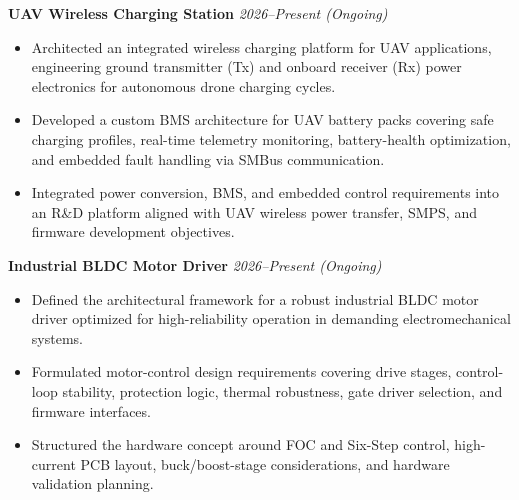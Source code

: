 \documentclass[a4paper,10pt]{article}
\newcommand{\projectheading}[2]{%
  \vspace{4pt}\noindent\textbf{#1} \hfill \textit{\small #2}\\%
}
\begin{document}
\projectheading{UAV Wireless Charging Station}{2026--Present \normalfont\small(Ongoing)}
\begin{itemize}
  \item Architected an integrated wireless charging platform for UAV applications, engineering
        ground transmitter (Tx) and onboard receiver (Rx) power electronics for autonomous
        drone charging cycles.
  \item Developed a custom BMS architecture for UAV battery packs covering safe charging
        profiles, real-time telemetry monitoring, battery-health optimization, and embedded
        fault handling via SMBus communication.
  \item Integrated power conversion, BMS, and embedded control requirements into an R\&D
        platform aligned with UAV wireless power transfer, SMPS, and firmware development
        objectives.
\end{itemize}

\projectheading{Industrial BLDC Motor Driver}{2026--Present \normalfont\small(Ongoing)}
\begin{itemize}
  \item Defined the architectural framework for a robust industrial BLDC motor driver
        optimized for high-reliability operation in demanding electromechanical systems.
  \item Formulated motor-control design requirements covering drive stages, control-loop
        stability, protection logic, thermal robustness, gate driver selection, and
        firmware interfaces.
  \item Structured the hardware concept around FOC and Six-Step control, high-current PCB
        layout, buck/boost-stage considerations, and hardware validation planning.
\end{itemize}
\end{document}
